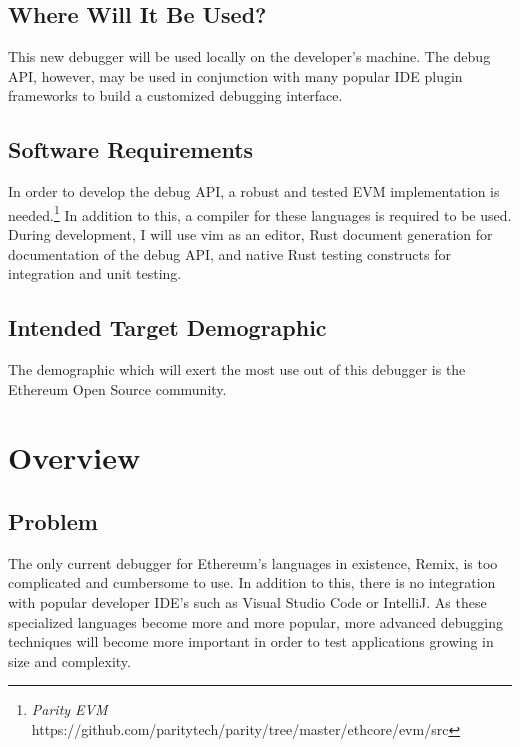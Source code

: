 \documentclass[]{article}
\begin{document}
\subsection{Where Will It Be Used?}
 
This new debugger will be used locally on the developer's machine. The debug API, however, may be used in conjunction with many popular IDE plugin frameworks to build a customized debugging interface.

\subsection{Software Requirements}
In order to develop the debug API, a robust and tested EVM implementation is needed.\footnote{\textit{Parity EVM} https://github.com/paritytech/parity/tree/master/ethcore/evm/src} In addition to this, a compiler for these languages is required to be used. During development, I will use vim as an editor, Rust document generation for documentation of the debug API, and native Rust testing constructs for integration and unit testing.

\subsection{Intended Target Demographic}
The demographic which will exert the most use out of this debugger is the Ethereum Open Source community.

\section{Overview}

\subsection{Problem}
The only current debugger for Ethereum's languages in existence, Remix, is too complicated and cumbersome to use. In addition to this, there is no integration with popular developer IDE's such as Visual Studio Code or IntelliJ. As these specialized languages become more and more popular, more advanced debugging techniques will become more important in order to test applications growing in size and complexity. 
\end{document}

